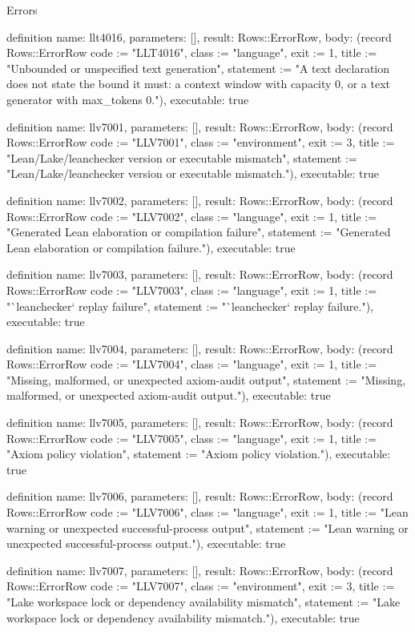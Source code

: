 \begin{lexlean}{Errors}
\begin{semanticmodule}
definition{
  name: llt4016,
  parameters: [],
  result: Rows::ErrorRow,
  body: (record Rows::ErrorRow {code := "LLT4016", class := "language", exit := 1, title := "Unbounded or unspecified text generation", statement := "A text declaration does not state the bound it must: a context window with capacity 0, or a text generator with max_tokens 0."}),
  executable: true
}

definition{
  name: llv7001,
  parameters: [],
  result: Rows::ErrorRow,
  body: (record Rows::ErrorRow {code := "LLV7001", class := "environment", exit := 3, title := "Lean/Lake/leanchecker version or executable mismatch", statement := "Lean/Lake/leanchecker version or executable mismatch."}),
  executable: true
}

definition{
  name: llv7002,
  parameters: [],
  result: Rows::ErrorRow,
  body: (record Rows::ErrorRow {code := "LLV7002", class := "language", exit := 1, title := "Generated Lean elaboration or compilation failure", statement := "Generated Lean elaboration or compilation failure."}),
  executable: true
}

definition{
  name: llv7003,
  parameters: [],
  result: Rows::ErrorRow,
  body: (record Rows::ErrorRow {code := "LLV7003", class := "language", exit := 1, title := "`leanchecker` replay failure", statement := "`leanchecker` replay failure."}),
  executable: true
}

definition{
  name: llv7004,
  parameters: [],
  result: Rows::ErrorRow,
  body: (record Rows::ErrorRow {code := "LLV7004", class := "language", exit := 1, title := "Missing, malformed, or unexpected axiom-audit output", statement := "Missing, malformed, or unexpected axiom-audit output."}),
  executable: true
}

definition{
  name: llv7005,
  parameters: [],
  result: Rows::ErrorRow,
  body: (record Rows::ErrorRow {code := "LLV7005", class := "language", exit := 1, title := "Axiom policy violation", statement := "Axiom policy violation."}),
  executable: true
}

definition{
  name: llv7006,
  parameters: [],
  result: Rows::ErrorRow,
  body: (record Rows::ErrorRow {code := "LLV7006", class := "language", exit := 1, title := "Lean warning or unexpected successful-process output", statement := "Lean warning or unexpected successful-process output."}),
  executable: true
}

definition{
  name: llv7007,
  parameters: [],
  result: Rows::ErrorRow,
  body: (record Rows::ErrorRow {code := "LLV7007", class := "environment", exit := 3, title := "Lake workspace lock or dependency availability mismatch", statement := "Lake workspace lock or dependency availability mismatch."}),
  executable: true
}


\end{semanticmodule}
\end{lexlean}
